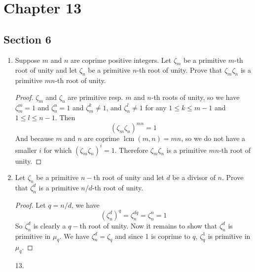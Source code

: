 \documentclass[hidelinks,12pt]{article}
\title{\scalebox{1.5}{Math 835 Homework 6}}
\author{\scalebox{1.5}{Theo Koss}}
\date{October 2024}
\renewcommand{\leq}{\leqslant}
\begin{document}
\maketitle
\section*{Chapter 13}
\subsection*{Section 6}
\begin{enumerate}
    \item Suppose \(m\) and \(n\) are coprime positive integers. Let \(\zeta_{m}\) be a primitive \(m\)-th root of unity and let \(\zeta_{n}\) be a primitive \(n\)-th root of unity. Prove that \(\zeta_{m}\zeta_{n}\) is a primitive \(mn\)-th root of unity.
        \begin{proof}
        \(\zeta_{m}\) and \(\zeta_{n}\) are primitive resp. \(m\) and \(n\)-th roots of unity, so we have \(\zeta_{m}^{m}=1\) and \(\zeta^{n}_{n}=1\) and \(\zeta_{m}^{k}\neq1\), and \(\zeta_{n}^{l}\neq1\) for any \(1\leq k\leq m-1\) and \(1\leq l\leq n-1\). Then \[
            (\zeta_{m}\zeta_{n})^{mn}=1
        \]
        And because \(m\) and \(n\) are coprime \(\operatorname{lcm}(m,n)=mn\), so we do not have a smaller \(i\) for which \((\zeta_{m}\zeta_{n})^{i}=1\). Therefore \(\zeta_{m}\zeta_{n}\) is a primitive \(mn\)-th root of unity.
        \end{proof}
    \item Let \(\zeta_{n}\) be a primitive \(n-\)th root of unity and let \(d\) be a divisor of \(n\). Prove that \(\zeta_{n}^{d}\) is a primitive \(n/d\)-th root of unity.
        \begin{proof}
            Let \(q=n/d\), we have
            \[
                (\zeta_{n}^{d})^{q}=\zeta_{n}^{dq}=\zeta_{n}^{n}=1
            \]
            So \(\zeta_{n}^{d}\) is clearly a \(q-\)th root of unity. Now it remains to show that \(\zeta_{n}^{d}\) is primitive in \(\mu_{q}\). We have \(\zeta_{n}^{d}=\zeta_{q}\) and since 1 is coprime to \(q\), \(\zeta_{q}^{1}\) is primitive in \(\mu_{q}\).
        \end{proof}
    \item[13.] 
\end{enumerate}
\end{document}
